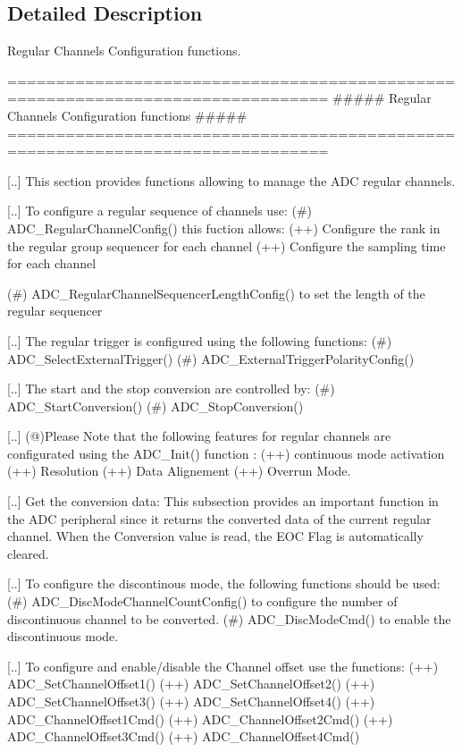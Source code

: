 \subsection{Detailed Description}
Regular Channels Configuration functions. \begin{DoxyVerb} ===============================================================================
                  ##### Regular Channels Configuration functions #####
 ===============================================================================  

  [..] This section provides functions allowing to manage the ADC regular channels.
   
  [..] To configure a regular sequence of channels use:
   (#) ADC_RegularChannelConfig()
       this fuction allows:
       (++) Configure the rank in the regular group sequencer for each channel
       (++) Configure the sampling time for each channel

   (#) ADC_RegularChannelSequencerLengthConfig() to set the length of the regular sequencer

   [..] The regular trigger is configured using the following functions:
   (#) ADC_SelectExternalTrigger()
   (#) ADC_ExternalTriggerPolarityConfig()

   [..] The start and the stop conversion are controlled by:
   (#) ADC_StartConversion()
   (#) ADC_StopConversion()
    
   [..] 
   (@)Please Note that the following features for regular channels are configurated
     using the ADC_Init() function : 
          (++) continuous mode activation
          (++) Resolution  
          (++) Data Alignement 
          (++) Overrun Mode.
     
  [..] Get the conversion data: This subsection provides an important function in 
     the ADC peripheral since it returns the converted data of the current 
     regular channel. When the Conversion value is read, the EOC Flag is 
     automatically cleared.

  [..] To configure the  discontinous mode, the following functions should be used:
   (#) ADC_DiscModeChannelCountConfig() to configure the number of discontinuous channel to be converted.
   (#) ADC_DiscModeCmd() to enable the discontinuous mode.

  [..] To configure and enable/disable the Channel offset use the functions:
     (++) ADC_SetChannelOffset1()
     (++) ADC_SetChannelOffset2()
     (++) ADC_SetChannelOffset3()
     (++) ADC_SetChannelOffset4()
     (++) ADC_ChannelOffset1Cmd()
     (++) ADC_ChannelOffset2Cmd()
     (++) ADC_ChannelOffset3Cmd()
     (++) ADC_ChannelOffset4Cmd()\end{DoxyVerb}


